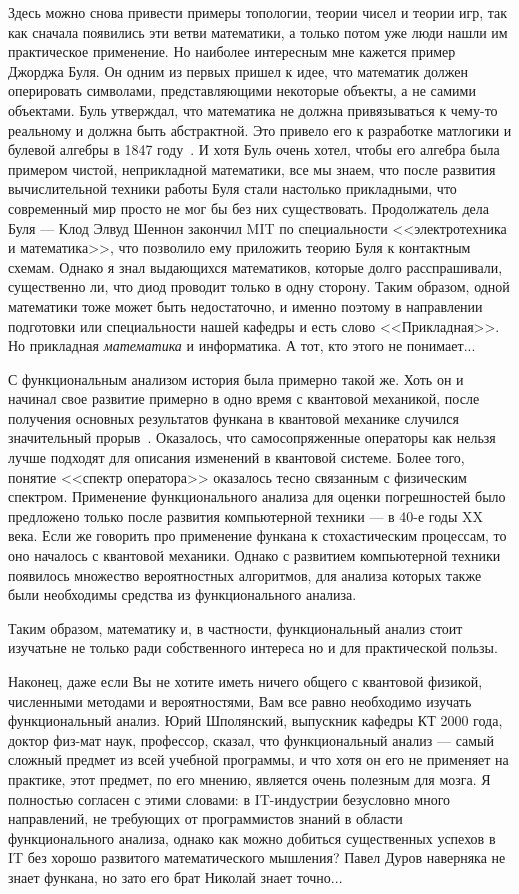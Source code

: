 \documentclass[russian]{article}
\begin{document}
Здесь можно снова привести примеры топологии, теории чисел и теории игр, так как сначала появились эти ветви математики, а только потом уже люди нашли им практическое применение. Но наиболее интересным мне кажется пример Джорджа Буля. Он одним из первых пришел к идее, что математик должен оперировать символами, представляющими некоторые объекты, а не самими объектами. Буль утверждал, что математика не должна привязываться к чему-то реальному и  должна быть абстрактной. Это привело его к разработке матлогики и булевой алгебры в 1847 году~\cite{boole}. И хотя Буль очень хотел, чтобы его алгебра была примером чистой, неприкладной математики, все мы знаем, что после развития вычислительной техники работы Буля стали настолько прикладными, что современный мир просто не мог бы без них существовать. Продолжатель дела Буля --- Клод Элвуд Шеннон закончил MIT по специальности <<электротехника и математика>>, что позволило ему приложить теорию Буля к контактным схемам. Однако я знал выдающихся математиков, которые долго расспрашивали, существенно ли, что диод проводит только в одну сторону. Таким образом, одной математики тоже может быть недостаточно, и именно поэтому в направлении подготовки или специальности нашей кафедры и есть слово <<Прикладная>>. Но прикладная \emph{математика} и информатика. А тот, кто этого не понимает...

С функциональным анализом история была примерно такой же. Хоть он и начинал свое развитие примерно в одно время с квантовой механикой, после получения основных результатов функана в квантовой механике случился значительный прорыв~\cite{quantum}. Оказалось, что самосопряженные операторы как нельзя лучше подходят для описания изменений в квантовой системе. Более того, понятие <<спектр оператора>> оказалось тесно связанным с физическим спектром.
Применение функционального анализа для оценки погрешностей было предложено только после развития компьютерной техники --- в 40-е годы XX века. Если же говорить про применение функана к стохастическим процессам, то оно началось с квантовой механики. Однако с развитием компьютерной техники появилось множество вероятностных алгоритмов, для анализа которых также были необходимы средства из функционального анализа.

Таким образом, математику и, в частности, функциональный анализ стоит изучатьне не только ради собственного интереса но и для практической пользы.

Наконец, даже если Вы не хотите иметь ничего общего с квантовой физикой, численными методами и вероятностями, Вам все равно необходимо изучать функциональный анализ. Юрий Шполянский, выпускник кафедры КТ 2000 года, доктор физ-мат наук, профессор, сказал, что функциональный анализ --- самый сложный предмет из всей учебной программы, и что хотя он его не применяет на практике, этот предмет, по его мнению, является очень полезным для мозга. Я полностью согласен с этими словами: в IT-индустрии безусловно много направлений, не требующих от программистов знаний в области функционального анализа, однако как можно добиться существенных успехов в IT без хорошо развитого математического мышления? Павел Дуров наверняка не знает функана, но зато его брат Николай знает точно...
\end{document}
